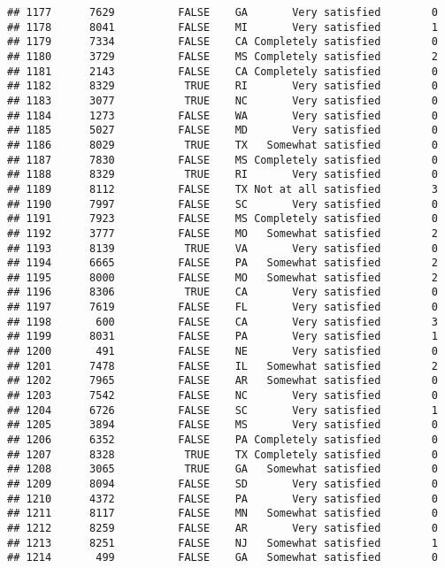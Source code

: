 \documentclass[]{book}
\theoremstyle{definition}
\theoremstyle{definition}
\theoremstyle{remark}
\begin{document}
\begin{verbatim}
## 1177      7629          FALSE    GA       Very satisfied        0
## 1178      8041          FALSE    MI       Very satisfied        1
## 1179      7334          FALSE    CA Completely satisfied        0
## 1180      3729          FALSE    MS Completely satisfied        2
## 1181      2143          FALSE    CA Completely satisfied        0
## 1182      8329           TRUE    RI       Very satisfied        0
## 1183      3077           TRUE    NC       Very satisfied        0
## 1184      1273          FALSE    WA       Very satisfied        0
## 1185      5027          FALSE    MD       Very satisfied        0
## 1186      8029           TRUE    TX   Somewhat satisfied        0
## 1187      7830          FALSE    MS Completely satisfied        0
## 1188      8329           TRUE    RI       Very satisfied        0
## 1189      8112          FALSE    TX Not at all satisfied        3
## 1190      7997          FALSE    SC       Very satisfied        0
## 1191      7923          FALSE    MS Completely satisfied        0
## 1192      3777          FALSE    MO   Somewhat satisfied        2
## 1193      8139           TRUE    VA       Very satisfied        0
## 1194      6665          FALSE    PA   Somewhat satisfied        2
## 1195      8000          FALSE    MO   Somewhat satisfied        2
## 1196      8306           TRUE    CA       Very satisfied        0
## 1197      7619          FALSE    FL       Very satisfied        0
## 1198       600          FALSE    CA       Very satisfied        3
## 1199      8031          FALSE    PA       Very satisfied        1
## 1200       491          FALSE    NE       Very satisfied        0
## 1201      7478          FALSE    IL   Somewhat satisfied        2
## 1202      7965          FALSE    AR   Somewhat satisfied        0
## 1203      7542          FALSE    NC       Very satisfied        0
## 1204      6726          FALSE    SC       Very satisfied        1
## 1205      3894          FALSE    MS       Very satisfied        0
## 1206      6352          FALSE    PA Completely satisfied        0
## 1207      8328           TRUE    TX Completely satisfied        0
## 1208      3065           TRUE    GA   Somewhat satisfied        0
## 1209      8094          FALSE    SD       Very satisfied        0
## 1210      4372          FALSE    PA       Very satisfied        0
## 1211      8117          FALSE    MN   Somewhat satisfied        0
## 1212      8259          FALSE    AR       Very satisfied        0
## 1213      8251          FALSE    NJ   Somewhat satisfied        1
## 1214       499          FALSE    GA   Somewhat satisfied        0

\end{verbatim}
\end{document}
